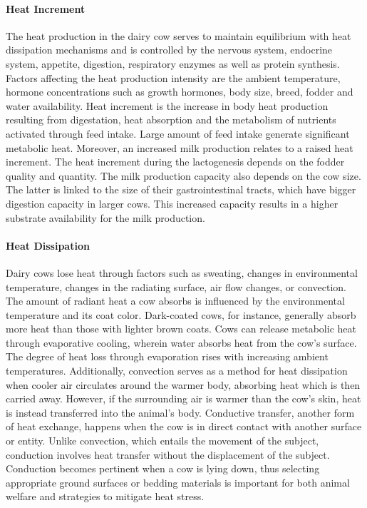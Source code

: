 \paragraph{Heat Increment}
The heat production in the dairy cow serves to maintain equilibrium with heat dissipation mechanisms and is controlled by the nervous system, endocrine system, appetite, digestion, respiratory enzymes as well as protein synthesis. Factors affecting the heat production intensity are the ambient temperature, hormone concentrations such as growth hormones, body size, breed, fodder and water availability. Heat increment is the increase in body heat production resulting from digestation, heat absorption and the metabolism of nutrients activated through feed intake. Large amount of feed intake generate significant metabolic heat. Moreover, an increased milk production relates to a raised heat increment. The heat increment during the lactogenesis depends on the fodder quality and quantity. The milk production capacity also depends on the cow size. The latter is linked to the size of their gastrointestinal tracts, which have bigger digestion capacity in larger cows. This increased capacity results in a higher substrate availability for the milk production. 

\paragraph{Heat Dissipation}
Dairy cows lose heat through factors such as sweating, changes in environmental temperature, changes in the radiating surface, air flow changes, or convection. The amount of radiant heat a cow absorbs is influenced by the environmental temperature and its coat color. Dark-coated cows, for instance, generally absorb more heat than those with lighter brown coats. Cows can release metabolic heat through evaporative cooling, wherein water absorbs heat from the cow's surface. The degree of heat loss through evaporation rises with increasing ambient temperatures. Additionally, convection serves as a method for heat dissipation when cooler air circulates around the warmer body, absorbing heat which is then carried away. However, if the surrounding air is warmer than the cow's skin, heat is instead transferred into the animal's body. Conductive transfer, another form of heat exchange, happens when the cow is in direct contact with another surface or entity. Unlike convection, which entails the movement of the subject, conduction involves heat transfer without the displacement of the subject. Conduction becomes pertinent when a cow is lying down, thus selecting appropriate ground surfaces or bedding materials is important for both animal welfare and strategies to mitigate heat stress.

